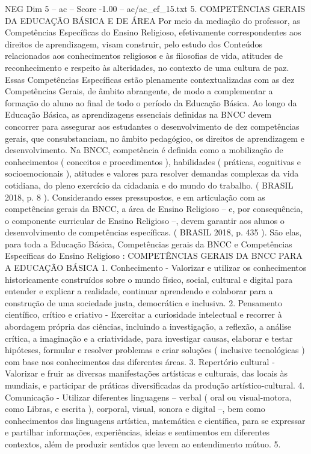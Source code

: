 \begin{textsample}{NEG Dim 5 – ac – Score -1.00 – ac/ac\_ef\_15.txt}  \label{ex:f5_neg_168}
5.
COMPETÊNCIAS GERAIS DA EDUCAÇÃO BÁSICA E DE ÁREA Por meio da mediação do professor, as Competências Específicas do Ensino Religioso, efetivamente correspondentes aos direitos de aprendizagem, visam construir, pelo estudo dos Conteúdos relacionados aos conhecimentos religiosos e às filosofias de vida, atitudes de reconhecimento e respeito às alteridades, no contexto de uma cultura de paz.
Essas Competências Específicas estão plenamente contextualizadas com as dez Competências Gerais, de âmbito abrangente, de modo a complementar a formação do aluno ao final de todo o período da Educação Básica.
Ao longo da Educação Básica, as aprendizagens essenciais definidas na BNCC devem concorrer para assegurar aos estudantes o desenvolvimento de dez competências gerais, que consubstanciam, no âmbito pedagógico, os direitos de aprendizagem e desenvolvimento.
Na BNCC, competência é definida como a mobilização de conhecimentos ( conceitos e procedimentos ), habilidades ( práticas, cognitivas e socioemocionais ), atitudes e valores para resolver demandas complexas da vida cotidiana, do pleno exercício da cidadania e do mundo do trabalho. ( BRASIL 2018, p. 8 ).
Considerando esses pressupostos, e em articulação com as competências gerais da BNCC, a área de Ensino Religioso – e, por consequência, o componente curricular de Ensino Religioso –, devem garantir aos alunos o desenvolvimento de competências específicas. ( BRASIL 2018, p. 435 ).
São elas, para toda a Educação Básica, Competências gerais da BNCC e Competências Específicas do Ensino Religioso : COMPETÊNCIAS GERAIS DA BNCC PARA A EDUCAÇÃO BÁSICA 1.
Conhecimento - Valorizar e utilizar os conhecimentos historicamente construídos sobre o mundo físico, social, cultural e digital para entender e explicar a realidade, continuar aprendendo e colaborar para a construção de uma sociedade justa, democrática e inclusiva. 2.
Pensamento científico, crítico e criativo - Exercitar a curiosidade intelectual e recorrer à abordagem própria das ciências, incluindo a investigação, a reflexão, a análise crítica, a imaginação e a criatividade, para investigar causas, elaborar e testar hipóteses, formular e resolver problemas e criar soluções ( inclusive tecnológicas ) com base nos conhecimentos das diferentes áreas. 3.
Repertório cultural - Valorizar e fruir as diversas manifestações artísticas e culturais, das locais às mundiais, e participar de práticas diversificadas da produção artístico-cultural. 4.
Comunicação - Utilizar diferentes linguagens – verbal ( oral ou visual-motora, como Libras, e escrita ), corporal, visual, sonora e digital –, bem como conhecimentos das linguagens artística, matemática e científica, para se expressar e partilhar informações, experiências, ideias e sentimentos em diferentes contextos, além de produzir sentidos que levem ao entendimento mútuo. 5.

\end{textsample}
